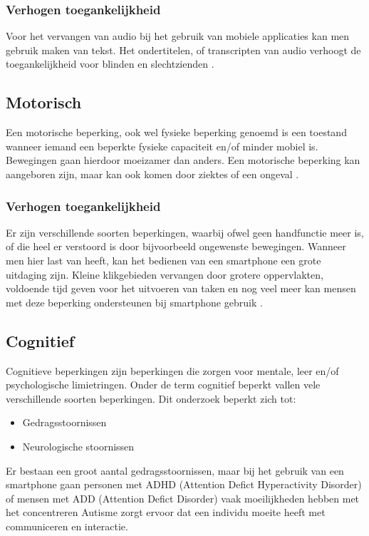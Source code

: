 \subsubsection{Verhogen toegankelijkheid}
Voor het vervangen van audio bij het gebruik van mobiele applicaties kan men gebruik maken van tekst. Het ondertitelen, of transcripten van audio verhoogt de toegankelijkheid voor blinden en slechtzienden \autocite{accessibility2019}.

\subsection{Motorisch}
\label{sec:Motorisch}
Een motorische beperking, ook wel fysieke beperking genoemd is een toestand wanneer iemand een beperkte fysieke capaciteit en/of minder mobiel is. Bewegingen gaan hierdoor moeizamer dan anders. Een motorische beperking kan aangeboren zijn, maar kan ook komen door ziektes of een ongeval \autocite{achieveAU2019}.

\subsubsection{Verhogen toegankelijkheid}
Er zijn verschillende soorten beperkingen, waarbij ofwel geen handfunctie meer is, of die heel er verstoord is door bijvoorbeeld ongewenste bewegingen. Wanneer men hier last van heeft, kan het bedienen van een smartphone een grote uitdaging zijn. 
Kleine klikgebieden vervangen door grotere oppervlakten, voldoende tijd geven voor het uitvoeren van taken en nog veel meer kan mensen met deze beperking ondersteunen bij smartphone gebruik \autocite{accessibility2019}.







\subsection{Cognitief}
\label{sec:cognitief}
Cognitieve beperkingen zijn beperkingen die zorgen voor mentale, leer en/of psychologische limietringen. Onder de term cognitief beperkt vallen vele verschillende soorten beperkingen. Dit onderzoek beperkt zich tot:
\begin{itemize}
    \item Gedragsstoornissen
    \item Neurologische stoornissen 
\end{itemize}

Er bestaan een groot aantal gedragsstoornissen, maar bij het gebruik van een smartphone gaan personen met ADHD (Attention Defict Hyperactivity Disorder) of mensen met ADD (Attention Defict Disorder) vaak moeilijkheden hebben met het concentreren Autisme zorgt ervoor dat een individu moeite heeft met communiceren en interactie.

